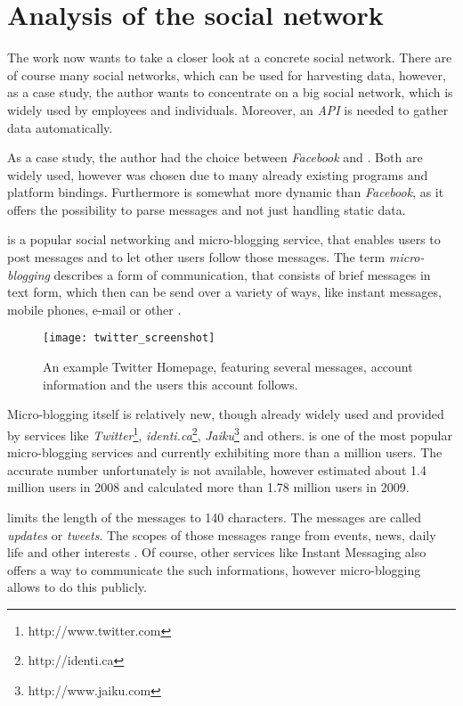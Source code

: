 \chapter{Analysis of the social network \Twitter}
\label{chapter:analysis}

The work now wants to take a closer look at a concrete social network.
There are of course many social networks, which can be used for harvesting
data, however, as a case study, the author wants to concentrate on a big social
network, which is widely used by employees and individuals. Moreover,
an \textit{API} is needed to gather data automatically.

As a case study, the author had the choice between \textit{Facebook} and
\Twitter. Both are widely used, however \Twitter{} was chosen due to many
already existing programs and platform bindings. Furthermore \Twitter{} is
somewhat more dynamic than \textit{Facebook}, as it offers the possibility to
parse \Twitter{} messages and not just handling static data.

\Twitter{} is a popular social networking and micro-blogging service, that
enables users to post messages and to let other users follow those messages.
The term \textit{micro-blogging} describes a form of communication, that
consists of brief messages in text form, which then can be send over a variety
of ways, like instant messages, mobile phones, e-mail or other \cite{java2007}.

\begin{figure}[hbt]
  \centering
  \texttt{[image: twitter\_screenshot]}
  \caption{An example Twitter Homepage, featuring several \Twitter{}
  messages, account information and the users this account
  follows.}\label{fig:twitter_screenshot}
\end{figure}

Micro-blogging itself is relatively new, though already widely used and
provided by services like
\textit{Twitter}\footnote{http://www.twitter.com},
\textit{identi.ca}\footnote{http://identi.ca},
\textit{Jaiku}\footnote{http://www.jaiku.com} and others. \Twitter{} is one of
the most popular micro-blogging services \cite{java2007} and currently
exhibiting more than a million users. The accurate number unfortunately is not
available, however \cite{krishnamurthy2008} estimated about 1.4 million users
in 2008 and \cite{whitworth2009} calculated more than 1.78 million users in
2009.

\Twitter{} limits the length of the messages to 140 characters. The messages
are called \textit{updates} or \textit{tweets}.  The scopes of those messages
range from events, news, daily life and other interests \cite{java2007}. Of
course, other services like Instant Messaging also offers a way to communicate
the such informations, however micro-blogging allows to do this publicly.

